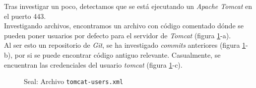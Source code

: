 Tras investigar un poco, detectamos que se está ejecutando un \textit{Apache Tomcat} en el puerto 443.\\

Investigando archivos, encontramos un archivo con código comentado dónde se pueden poner usuarios por defecto para el servidor de \textit{Tomcat} (figura \ref{fig:seal-tomcat-users}-a).\\

Al ser esto un repositorio de \textit{Git}, se ha investigado \textit{commits} anteriores (figura \ref{fig:seal-tomcat-users}-b), por si se puede encontrar código antiguo relevante. Casualmente, se encuentran las credenciales del usuario \textit{tomcat} (figura \ref{fig:seal-tomcat-users}-c).\\

\begin{figure}
    \centering
    \qquad
    \qquad
    \caption{Seal: Archivo \texttt{tomcat-users.xml}}
    \label{fig:seal-tomcat-users}
\end{figure}

